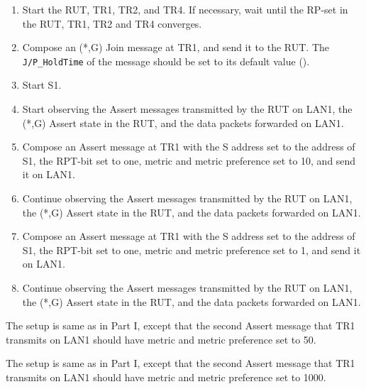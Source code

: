 \documentclass[11pt]{report}
\begin{document}
\begin{enumerate}

  \item Start the RUT, TR1, TR2, and TR4. If necessary, wait until the RP-set
  in the RUT, TR1, TR2 and TR4 converges.

  \item Compose an (*,G) Join message at TR1, and send it to the RUT.
  The \verb=J/P_HoldTime= of the message should be set to its default
  value ({\PimsmJPHoldTime}).

  \item Start S1.

  \item Start observing the Assert messages transmitted by the RUT on
  LAN1, the (*,G) Assert state in the RUT, and the data packets forwarded on
  LAN1.

  \item Compose an Assert message at TR1 with the S address set to the
  address of S1, the RPT-bit set to one, metric and metric preference set to
  10, and send it on LAN1.

  \item Continue observing the Assert messages transmitted by the RUT on
  LAN1, the (*,G) Assert state in the RUT, and the data packets forwarded on
  LAN1.

  \item Compose an Assert message at TR1 with the S address set to the
  address of S1, the RPT-bit set to one, metric and metric preference set to
  1, and send it on LAN1.

  \item Continue observing the Assert messages transmitted by the RUT on
  LAN1, the (*,G) Assert state in the RUT, and the data packets forwarded on
  LAN1.

\end{enumerate}


The setup is same as in Part I, except that the second Assert message that TR1
transmits on LAN1 should have metric and metric preference set to 50.


The setup is same as in Part I, except that the second Assert message that TR1
transmits on LAN1 should have metric and metric preference set to 1000.
\end{document}
